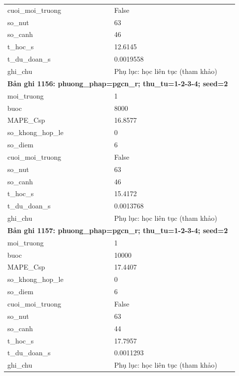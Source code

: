 \begin{longtable}{p{0.43\linewidth}p{0.50\linewidth}}
cuoi\_\allowbreak moi\_\allowbreak truong & False \\
so\_\allowbreak nut & 63 \\
so\_\allowbreak canh & 46 \\
t\_\allowbreak hoc\_\allowbreak s & 12.6145 \\
t\_\allowbreak du\_\allowbreak doan\_\allowbreak s & 0.0019558 \\
ghi\_\allowbreak chu & Phụ lục: học liên tục (tham khảo) \\
\midrule
\multicolumn{2}{p{0.95\linewidth}}{\textbf{Bản ghi 1156: phuong\_phap=pgcn\_r; thu\_tu=1-2-3-4; seed=2}} \\
moi\_\allowbreak truong & 1 \\
buoc & 8000 \\
MAPE\_\allowbreak Csp & 16.8577 \\
so\_\allowbreak khong\_\allowbreak hop\_\allowbreak le & 0 \\
so\_\allowbreak diem & 6 \\
cuoi\_\allowbreak moi\_\allowbreak truong & False \\
so\_\allowbreak nut & 63 \\
so\_\allowbreak canh & 46 \\
t\_\allowbreak hoc\_\allowbreak s & 15.4172 \\
t\_\allowbreak du\_\allowbreak doan\_\allowbreak s & 0.0013768 \\
ghi\_\allowbreak chu & Phụ lục: học liên tục (tham khảo) \\
\midrule
\multicolumn{2}{p{0.95\linewidth}}{\textbf{Bản ghi 1157: phuong\_phap=pgcn\_r; thu\_tu=1-2-3-4; seed=2}} \\
moi\_\allowbreak truong & 1 \\
buoc & 10000 \\
MAPE\_\allowbreak Csp & 17.4407 \\
so\_\allowbreak khong\_\allowbreak hop\_\allowbreak le & 0 \\
so\_\allowbreak diem & 6 \\
cuoi\_\allowbreak moi\_\allowbreak truong & False \\
so\_\allowbreak nut & 63 \\
so\_\allowbreak canh & 44 \\
t\_\allowbreak hoc\_\allowbreak s & 17.7957 \\
t\_\allowbreak du\_\allowbreak doan\_\allowbreak s & 0.0011293 \\
ghi\_\allowbreak chu & Phụ lục: học liên tục (tham khảo) \\

\end{longtable}
